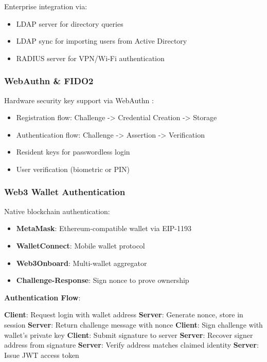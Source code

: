 Enterprise integration via:
\begin{itemize}
  \item LDAP server for directory queries
  \item LDAP sync for importing users from Active Directory
  \item RADIUS server for VPN/Wi-Fi authentication
\end{itemize}

\subsubsection{WebAuthn \& FIDO2}

Hardware security key support via WebAuthn \cite{webauthn}:
\begin{itemize}
  \item Registration flow: Challenge -> Credential Creation -> Storage
  \item Authentication flow: Challenge -> Assertion -> Verification
  \item Resident keys for passwordless login
  \item User verification (biometric or PIN)
\end{itemize}

\subsubsection{Web3 Wallet Authentication}

Native blockchain authentication:
\begin{itemize}
  \item \textbf{MetaMask}: Ethereum-compatible wallet via EIP-1193
  \item \textbf{WalletConnect}: Mobile wallet protocol
  \item \textbf{Web3Onboard}: Multi-wallet aggregator
  \item \textbf{Challenge-Response}: Sign nonce to prove ownership
\end{itemize}

\textbf{Authentication Flow}:
\begin{algorithm}
\caption{Web3 Wallet Authentication}
\begin{algorithmic}[1]
\State \textbf{Client}: Request login with wallet address
\State \textbf{Server}: Generate nonce, store in session
\State \textbf{Server}: Return challenge message with nonce
\State \textbf{Client}: Sign challenge with wallet's private key
\State \textbf{Client}: Submit signature to server
\State \textbf{Server}: Recover signer address from signature
\State \textbf{Server}: Verify address matches claimed identity
\State \textbf{Server}: Issue JWT access token
\end{algorithmic}
\end{algorithm}

